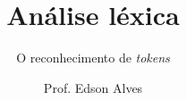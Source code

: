 \title{Análise léxica}
\subtitle{O reconhecimento de \textit{tokens}}
\date{}
\author{Prof. Edson Alves}
